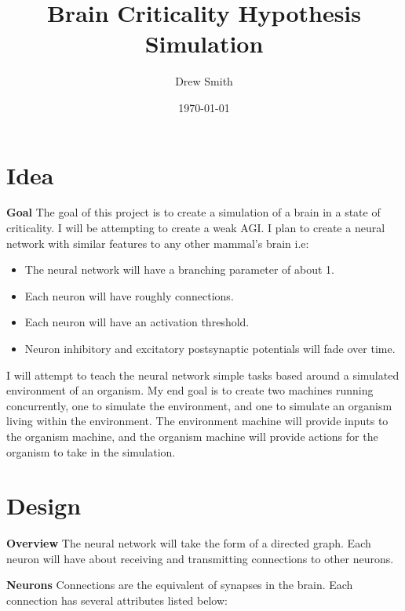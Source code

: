 \documentclass{article} %
\title{Brain Criticality Hypothesis Simulation} %
\author{Drew Smith} %
\date{\today} %
\begin{document}
    \maketitle %
    

    \section{Idea} %
    
        \textbf{Goal} The goal of this project is to create a simulation of a brain in a state of criticality. I will be attempting to create a weak AGI. I plan to create a neural network with similar features to any other mammal's brain i.e:
        
        \begin{itemize}[noitemsep]
            \item The neural network will have a branching parameter of about 1.
            \item Each neuron will have roughly \connectionCount connections.
            \item Each neuron will have an activation threshold.
            \item Neuron inhibitory and excitatory postsynaptic potentials will fade over time.
        \end{itemize}

        I will attempt to teach the neural network simple tasks based around a simulated environment of an organism. My end goal is to create two machines running concurrently, one to simulate the environment, and one to simulate an organism living within the environment. The environment machine will provide inputs to the organism machine, and the organism machine will provide actions for the organism to take in the simulation.

        \section{Design}

        \textbf{Overview} The neural network will take the form of a directed graph. Each neuron will have about \connectionCount receiving and transmitting connections to other neurons.\newline

        \textbf{Neurons} Connections are the equivalent of synapses in the brain. Each connection has several attributes listed below: 
\end{document}
